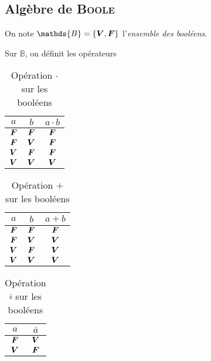 \subsection{Algèbre de {\scshape Boole}}

\begin{defn}
	On note $\mathds{B} = \{{\bfm V},{\bfm F}\}$\/ l'{\it ensemble des booléens}.
\end{defn}

\begin{defn}
	Sur $\mathds{B}$, on définit les opérateurs
	\begin{table}[H]
		\centering
		\begin{tabular}{c|c|c}
			$a$\/ & $b$\/ &$a\cdot b$\/ \\ \hline
			${\bm{F}}\/$\/&${\bm{F}}\/$\/&${\bm{F}}\/$\/\\
			${\bm{F}}\/$\/&${\bm{V}}\/$\/&${\bm{F}}\/$\/\\
			${\bm{V}}\/$\/&${\bm{F}}\/$\/&${\bm{F}}\/$\/\\
			${\bm{V}}\/$\/&${\bm{V}}\/$\/&${\bm{V}}\/$\/\\
		\end{tabular}
		\caption{Opération $\cdot $\/ sur les booléens}
	\end{table}

	\begin{table}[H]
		\centering
		\begin{tabular}{c|c|c}
			$a$\/ & $b$\/ &$a+b$\/ \\ \hline
			${\bm{F}}\/$\/&${\bm{F}}\/$\/&${\bm{F}}\/$\/\\
			${\bm{F}}\/$\/&${\bm{V}}\/$\/&${\bm{V}}\/$\/\\
			${\bm{V}}\/$\/&${\bm{F}}\/$\/&${\bm{V}}\/$\/\\
			${\bm{V}}\/$\/&${\bm{V}}\/$\/&${\bm{V}}\/$\/\\
		\end{tabular}
		\caption{Opération $+$\/ sur les booléens}
	\end{table}

	\begin{table}[H]
		\centering
		\begin{tabular}{c|c}
			$a$\/ &$\bar{a}$\/ \\ \hline
			${\bm{F}}\/$\/&${\bm{V}}\/$\/\\
			${\bm{V}}\/$\/&${\bm{F}}\/$\/\\
		\end{tabular}
		\caption{Opération $\bar{\square}$\/ sur les booléens}
	\end{table}
\end{defn}

